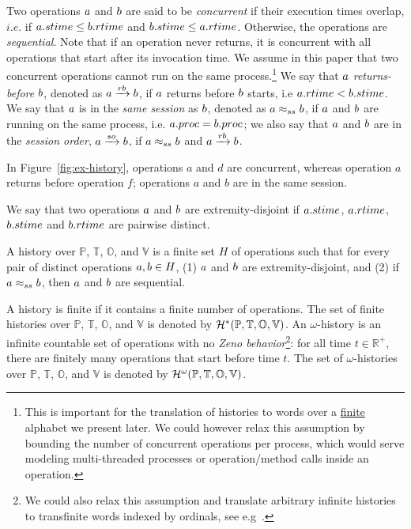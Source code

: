 Two operations $a$ and $b$ are said to be \emph{concurrent} if their execution times overlap, $i.e.$ if $a.stime\leq b.rtime$ and $b.stime\leq a.rtime$. Otherwise, the operations are \emph{sequential}. Note that if an operation never returns, it is concurrent with all operations that start after its invocation time. We assume in this paper that two concurrent operations cannot run on the same process.\footnote{This is important for the translation of histories to words over a \underline{finite} alphabet we present later. We could however relax this assumption by bounding the number of concurrent operations per process, which would serve modeling multi-threaded processes or operation/method calls inside an operation.}
We say that $a$ \emph{returns-before} $b$,  denoted as $a\xrightarrow{rb}b$, if $a$ returns before $b$ starts, i.e  $a.rtime<b.stime$. 
We say that $a$ is in the \emph{same session} as $b$, denoted as $a\approx_{ss}b$, if $a$ and $b$ are running on the same process, i.e. $a.proc=b.proc$; we also say that $a$ and $b$ are in the \emph{session order}, $a\xrightarrow{so}b$, if $a\approx_{ss}b$ and $a\xrightarrow{rb}b$.

\begin{example}
  In Figure~\ref{fig:ex-history}, operations $a$ and $d$ are concurrent, whereas operation $a$ returns before operation $f$; operations $a$ and $b$ are in the same session.
\end{example}

We say that two operations $a$ and $b$ are extremity-disjoint if $a.stime$, $a.rtime$, $b.stime$ and $b.rtime$ are pairwise distinct. 

\begin{definition}[History]\label{def:history}
  A history over $\mathbb{P}$, $\mathbb{T}$, $\mathbb{O}$, and $\mathbb{V}$ is a finite set $H$ of operations such that for every pair of distinct operations $a,b\in H$, (1) $a$ and $b$ are extremity-disjoint, and (2) if $a\approx_{ss} b$, then $a$ and $b$ are sequential.
\end{definition}

A history is finite if it contains a finite number of operations.
The set of finite histories over $\mathbb{P}$, $\mathbb{T}$, $\mathbb{O}$, and $\mathbb{V}$ is denoted by $\mathcal{H}^*(\mathbb{P}, \mathbb{T}, \mathbb{O}, \mathbb{V})$.
%
An $\omega$-history is an infinite countable set of operations with no \emph{Zeno behavior}\footnote{We could also relax this assumption and translate arbitrary infinite histories to transfinite words indexed by ordinals, see e.g~\cite{demri-nowak-05-transfinite-words}.}: for all time $t\in \mathbb{R}^+$, there are finitely many operations that start before time $t$.
The set of $\omega$-histories over $\mathbb{P}$, $\mathbb{T}$, $\mathbb{O}$, and $\mathbb{V}$ is denoted by $\mathcal{H}^\omega(\mathbb{P}, \mathbb{T}, \mathbb{O}, \mathbb{V})$.

